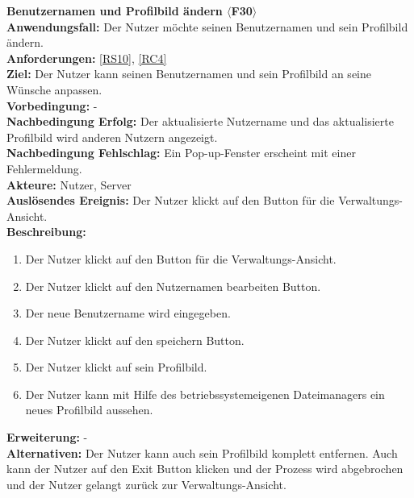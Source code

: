 \documentclass[parskip=full]{scrartcl}
\begin{document}
\textbf{Benutzernamen und Profilbild ändern $\langle$F30$\rangle$}\\
\textbf{Anwendungsfall:} Der Nutzer möchte seinen Benutzernamen und sein Profilbild ändern.\\
\textbf{Anforderungen:} \ref{RS10}, \ref{RC4}\\
\textbf{Ziel:} Der Nutzer kann seinen Benutzernamen und sein Profilbild an seine Wünsche anpassen.\\
\textbf{Vorbedingung:} -\\
\textbf{Nachbedingung Erfolg:} Der aktualisierte Nutzername und das aktualisierte Profilbild wird anderen Nutzern angezeigt.\\
\textbf{Nachbedingung Fehlschlag:} Ein Pop-up-Fenster erscheint mit einer Fehlermeldung.\\
\textbf{Akteure:} Nutzer, Server\\
\textbf{Auslösendes Ereignis:} Der Nutzer klickt auf den Button für die Verwaltungs-Ansicht.\\
\textbf{Beschreibung:}
\begin{enumerate}
    \item Der Nutzer klickt auf den Button für die Verwaltungs-Ansicht.
    \item Der Nutzer klickt auf den Nutzernamen bearbeiten Button.
    \item Der neue Benutzername wird eingegeben.
    \item Der Nutzer klickt auf den speichern Button.
    \item Der Nutzer klickt auf sein Profilbild.
    \item Der Nutzer kann mit Hilfe des betriebssystemeigenen Dateimanagers ein neues Profilbild aussehen.
\end{enumerate}
\textbf{Erweiterung:} -\\
\textbf{Alternativen:} Der Nutzer kann auch sein Profilbild komplett entfernen. Auch kann der Nutzer auf den Exit Button klicken und der Prozess wird abgebrochen und der Nutzer gelangt zurück zur Verwaltungs-Ansicht.\\
\newpage
\end{document}
